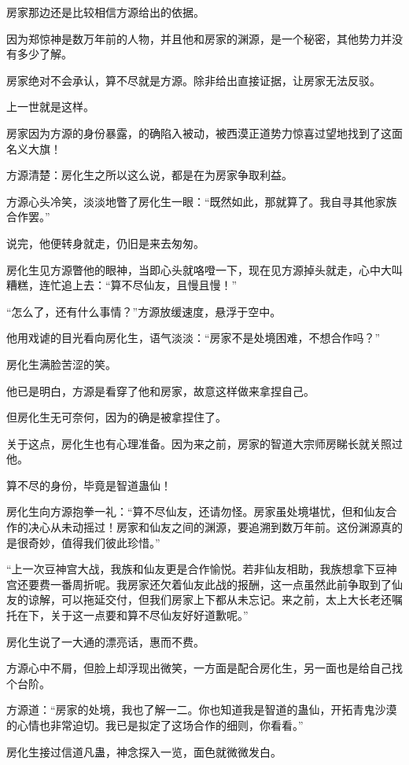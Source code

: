 \begin{this_body}
房家那边还是比较相信方源给出的依据。

因为郑惊神是数万年前的人物，并且他和房家的渊源，是一个秘密，其他势力并没有多少了解。

房家绝对不会承认，算不尽就是方源。除非给出直接证据，让房家无法反驳。

上一世就是这样。

房家因为方源的身份暴露，的确陷入被动，被西漠正道势力惊喜过望地找到了这面名义大旗！

方源清楚：房化生之所以这么说，都是在为房家争取利益。

方源心头冷笑，淡淡地瞥了房化生一眼：“既然如此，那就算了。我自寻其他家族合作罢。”

说完，他便转身就走，仍旧是来去匆匆。

房化生见方源瞥他的眼神，当即心头就咯噔一下，现在见方源掉头就走，心中大叫糟糕，连忙追上去：“算不尽仙友，且慢且慢！”

“怎么了，还有什么事情？”方源放缓速度，悬浮于空中。

他用戏谑的目光看向房化生，语气淡淡：“房家不是处境困难，不想合作吗？”

房化生满脸苦涩的笑。

他已是明白，方源是看穿了他和房家，故意这样做来拿捏自己。

但房化生无可奈何，因为的确是被拿捏住了。

关于这点，房化生也有心理准备。因为来之前，房家的智道大宗师房睇长就关照过他。

算不尽的身份，毕竟是智道蛊仙！

房化生向方源抱拳一礼：“算不尽仙友，还请勿怪。房家虽处境堪忧，但和仙友合作的决心从未动摇过！房家和仙友之间的渊源，要追溯到数万年前。这份渊源真的是很奇妙，值得我们彼此珍惜。”

“上一次豆神宫大战，我族和仙友更是合作愉悦。若非仙友相助，我族想拿下豆神宫还要费一番周折呢。我房家还欠着仙友此战的报酬，这一点虽然此前争取到了仙友的谅解，可以拖延交付，但我们房家上下都从未忘记。来之前，太上大长老还嘱托在下，关于这一点要和算不尽仙友好好道歉呢。”

房化生说了一大通的漂亮话，惠而不费。

方源心中不屑，但脸上却浮现出微笑，一方面是配合房化生，另一面也是给自己找个台阶。

方源道：“房家的处境，我也了解一二。你也知道我是智道的蛊仙，开拓青鬼沙漠的心情也非常迫切。我已是拟定了这场合作的细则，你看看。”

房化生接过信道凡蛊，神念探入一览，面色就微微发白。


\end{this_body}
